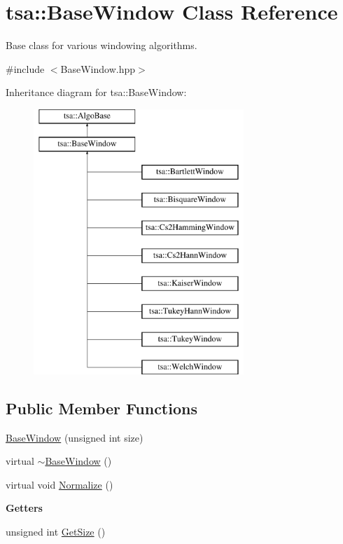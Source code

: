 \hypertarget{classtsa_1_1_base_window}{}\section{tsa\+:\+:Base\+Window Class Reference}
\label{classtsa_1_1_base_window}


Base class for various windowing algorithms.  




{\ttfamily \#include $<$Base\+Window.\+hpp$>$}

Inheritance diagram for tsa\+:\+:Base\+Window\+:\begin{figure}[H]
\begin{center}
\leavevmode
\includegraphics[height=10.000000cm]{classtsa_1_1_base_window}
\end{center}
\end{figure}
\subsection*{Public Member Functions}
\begin{DoxyCompactItemize}
\item 
\hyperlink{classtsa_1_1_base_window_aea4dee45722299896913859d7b899d6f}{Base\+Window} (unsigned int size)
\item 
virtual \hyperlink{classtsa_1_1_base_window_a0e99ffa3d84e8c7a05f7de437bfd6241}{$\sim$\+Base\+Window} ()
\item 
virtual void \hyperlink{classtsa_1_1_base_window_ad6681a5cb29414a97af6be1ea7805a81}{Normalize} ()
\end{DoxyCompactItemize}
\begin{Indent}\textbf{ Getters}\par
\begin{DoxyCompactItemize}
\item 
unsigned int \hyperlink{classtsa_1_1_base_window_af3e45daf0401f06108c6634344532af8}{Get\+Size} ()
\end{DoxyCompactItemize}
\end{Indent}
